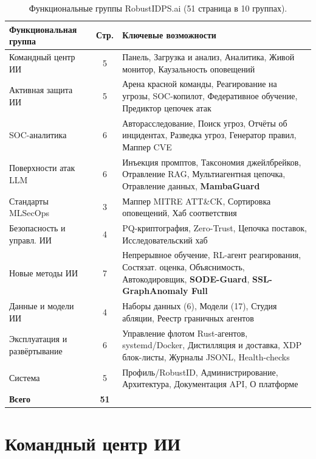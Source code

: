 \begin{table}[htbp]
\centering
\caption{Функциональные группы RobustIDPS.ai (51 страница в 10 группах).}
\label{tab:functional_groups}
\small
\begin{tabular}{lcp{7.5cm}}
\toprule
\textbf{Функциональная группа} & \textbf{Стр.} & \textbf{Ключевые возможности} \\
\midrule
Командный центр ИИ      & 5 & Панель, Загрузка и анализ, Аналитика, Живой монитор, Каузальность оповещений \\
Активная защита ИИ      & 5 & Арена красной команды, Реагирование на угрозы, SOC-копилот, Федеративное обучение, Предиктор цепочек атак \\
SOC-аналитика           & 6 & Авторасследование, Поиск угроз, Отчёты об инцидентах, Разведка угроз, Генератор правил, Маппер CVE \\
Поверхности атак LLM    & 6 & Инъекция промптов, Таксономия джейлбрейков, Отравление RAG, Мультиагентная цепочка, Отравление данных, \textbf{MambaGuard} \\
Стандарты MLSecOps       & 3 & Маппер MITRE ATT\&CK, Сортировка оповещений, Хаб соответствия \\
Безопасность и управл. ИИ & 4 & PQ-криптография, Zero-Trust, Цепочка поставок, Исследовательский хаб \\
Новые методы ИИ         & 7 & Непрерывное обучение, RL-агент реагирования, Состязат. оценка, Объяснимость, Автокодировщик, \textbf{SODE-Guard}, \textbf{SSL-GraphAnomaly Full} \\
Данные и модели ИИ      & 4 & Наборы данных (6), Модели (17), Студия абляции, Реестр граничных агентов \\
Эксплуатация и развёртывание & 6 & Управление флотом Rust-агентов, systemd/Docker, Дистилляция и доставка, XDP блок-листы, Журналы JSONL, Health-checks \\
Система                 & 5 & Профиль/RobustID, Администрирование, Архитектура, Документация API, О платформе \\
\midrule
\textbf{Всего}          & \textbf{51} & \\
\bottomrule
\end{tabular}
\end{table}


\section{Командный центр ИИ}
\label{sec:command_centre}

